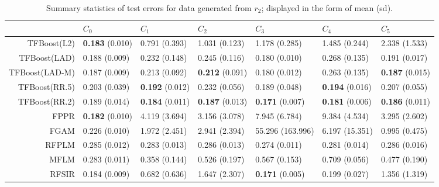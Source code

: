 \begin{table}[H]
\centering
\footnotesize
\begin{tabular}{rllllll}
  \hline
 & $C_0$ & $C_1$ & $C_2$ & $C_3$ & $C_4$ & $C_5$ \\ 
  \hline
TFBoost(L2) & \textbf{0.183} (0.010) & 0.791 (0.393) & 1.031 (0.123) & 1.178 (0.285) & 1.485 (0.244) & 2.338 (1.533) \\ 
  TFBoost(LAD) & 0.188 (0.009) & 0.232 (0.148) & 0.245 (0.116) & 0.180 (0.010) & 0.268 (0.135) & 0.191 (0.017) \\ 
  TFBoost(LAD-M) & 0.187 (0.009) & 0.213 (0.092) & \textbf{0.212} (0.091) & 0.180 (0.012) & 0.263 (0.135) & \textbf{0.187} (0.015) \\ 
  TFBoost(RR.5) & 0.203 (0.039) & \textbf{0.192} (0.012) & 0.232 (0.056) & 0.189 (0.048) & \textbf{0.194} (0.016) & 0.207 (0.055) \\ 
  TFBoost(RR.2) & 0.189 (0.014) & \textbf{0.184} (0.011) & \textbf{0.187} (0.013) & \textbf{0.171} (0.007) & \textbf{0.181} (0.006) & \textbf{0.186} (0.011) \\ 
  FPPR & \textbf{0.182} (0.010) & 4.119 (3.694) & 3.156 (3.078) & 7.945 (6.784) & 9.384 (4.534) & 3.295 (2.602) \\ 
  FGAM & 0.226 (0.010) & 1.972 (2.451) & 2.941 (2.394) & 55.296 (163.996) & 6.197 (15.351) & 0.995 (0.475) \\ 
  RFPLM & 0.285 (0.012) & 0.283 (0.013) & 0.286 (0.013) & 0.274 (0.011) & 0.281 (0.014) & 0.286 (0.016) \\ 
  MFLM & 0.283 (0.011) & 0.358 (0.144) & 0.526 (0.197) & 0.567 (0.153) & 0.709 (0.056) & 0.477 (0.190) \\ 
  RFSIR & 0.184 (0.009) & 0.682 (0.636) & 1.647 (2.307) & \textbf{0.171} (0.005) & 0.199 (0.027) & 1.356 (1.319) \\ 
   \hline
\end{tabular}
\caption{Summary statistics of test errors for data generated from $r_2$; displayed in the form of mean (sd).} 
\end{table}
